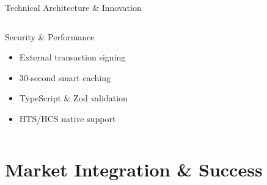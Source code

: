 \documentclass[aspectratio=169]{beamer}
\providecommand{\faSearchDollar}{\faDollarSign}
\begin{document}
\begin{frame}{Technical Architecture \& Innovation}
\begin{columns}
\begin{block}{Security \& Performance \hfill
{}}
\begin{itemize}
\item[\color{primary}\faCoins] External transaction signing
\item[\color{primary}\faComments] 30-second smart caching
\item[\color{primary}\faSearchDollar] TypeScript \& Zod validation
\item[\color{primary}\faSync] HTS/HCS native support
\end{itemize}
\end{block}
\end{columns}
\end{frame}

\section{Market Integration \& Success}
\end{document}
